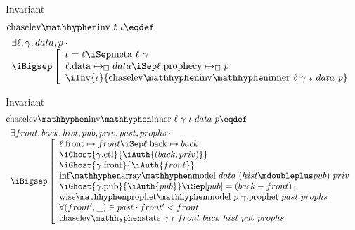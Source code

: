 \begin{frame}{Invariant}
\begin{align*}
		&\mathrm{chaselev \mathhyphen inv}\ t\ \iota
		\eqdef
	\\
		&\begin{array}{l}
				\exists \ell, \gamma, data, p \cdot \phantom{}
			\\
				\iBigsep\left[\begin{array}{l}
						t = \ell \iSep
						\mathrm{meta}\ \ell\ \gamma
					\\
						\ell\mathrm{.data} \mapsto_\square data \iSep
						\ell\mathrm{.prophecy} \mapsto_\square p
					\\
						\iInv{\iota}{\mathrm{chaselev \mathhyphen inv \mathhyphen inner}\ \ell\ \gamma\ \iota\ data\ p}
				\end{array}\right.
		\end{array}
\end{align*}
\end{frame}


\begin{frame}{Invariant}
\begin{align*}
		&\mathrm{chaselev \mathhyphen inv \mathhyphen inner}\ \ell\ \gamma\ \iota\ data\ p
		\eqdef
	\\
		&\begin{array}{l}
				\exists front, back, hist, pub, priv, past, prophs \cdot \phantom{}
			\\
				\iBigsep\left[\begin{array}{l}
						\ell\mathrm{.front} \mapsto front \iSep
						\ell\mathrm{.back} \mapsto back
					\\
						\iGhost{\gamma\mathrm{.ctl}}{\iAuth{(back, priv)}}
					\\
						\iGhost{\gamma\mathrm{.front}}{\iAuth{front}}
					\\
						\mathrm{inf \mathhyphen array \mathhyphen model}\ data\ (hist \mdoubleplus pub)\ priv
					\\
						\iGhost{\gamma\mathrm{.pub}}{\iAuth{pub}} \iSep
						| pub | = (back - front)_+
					\\
						\mathrm{wise \mathhyphen prophet \mathhyphen model}\ p\ \gamma\mathrm{.prophet}\ past\ prophs
					\\
						\forall (front', \_) \in past \cdot front' < front
					\\
						\mathrm{chaselev \mathhyphen state}\ \gamma\ \iota\ front\ back\ hist\ pub\ prophs
				\end{array}\right.
		\end{array}
\end{align*}
\end{frame}